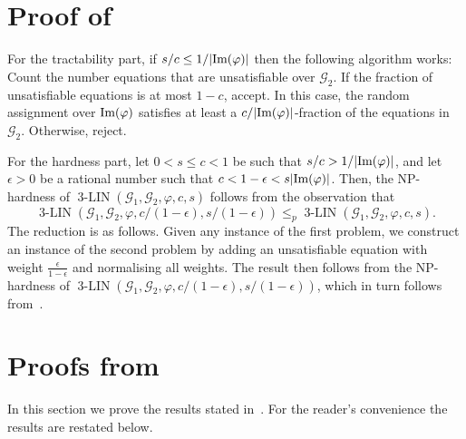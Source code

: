 \documentclass[a4paper,11pt]{article}
\theoremstyle{definition}
\newcommand{\gr}{\mathscr{G}}
\newcommand{\im}{\textnormal{Im}}
\newcommand{\eq}{\ensuremath{\operatorname{3-LIN}}}
\begin{document}
\appendix

\section{Proof of~}
\label{ap:non-cubic}

\THnoncubic*

For the tractability part, if $s/c \leq 1/|\im(\varphi)|$ then the
following algorithm works: Count the number equations that are unsatisfiable
over $\gr_2$. If the fraction of unsatisfiable equations is at most $1-c$,
accept. In this case, the random assignment over $\im(\varphi)$ satisfies at
least a $c/|\im(\varphi)|$-fraction of the equations in $\gr_2$. Otherwise, reject. \par

For the hardness part, let  $0<s\leq c <1$ be such that
$s/c > 1/|\im(\varphi)|$, and let $\epsilon >0$ be a rational number such that $c <
1-\epsilon < s|\im(\varphi)|$. Then, the NP-hardness of $\eq(\gr_1,\gr_2, \varphi, c, s)$ follows from the observation that 
\[
\eq(\gr_1,\gr_2, \varphi, c/(1-\epsilon), s/(1-\epsilon)) \leq_p
\eq(\gr_1,\gr_2, \varphi, c, s).
\]
The reduction is as follows. Given any instance of the first problem, we
construct an instance of the second problem by adding an unsatisfiable equation
with weight $\frac{\epsilon}{1-\epsilon}$ and normalising
all weights. The
result then follows from the NP-hardness of $\eq(\gr_1,\gr_2, \varphi,
c/(1-\epsilon), s/(1-\epsilon))$, which in turn follows from~.

\section{Proofs from~} \label{ap:fourier-proofs}

In this section we prove the results stated in~.
For the reader's convenience the results are restated below.

\LEfouriercoefficientaux*
\end{document}
